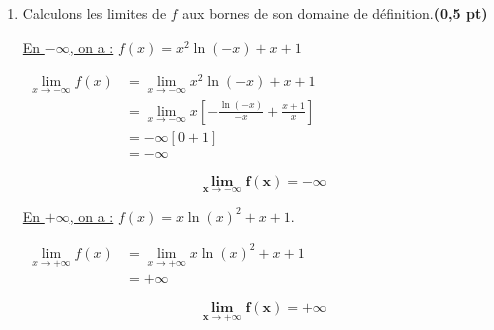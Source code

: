 \documentclass[12pt,a4paper]{article}
\begin{document}
\begin{enumerate}
\item Calculons les limites de \( f \) aux bornes de son domaine de définition.\hfill \textbf{(0,5 pt)}

\underline{En \( -\infty \), on a :} \( f(x) = x^2 \ln(-x) + x + 1 \)

\(
\begin{aligned}
    \lim\limits_{x\to -\infty} f(x) &= \lim\limits_{x\to -\infty} x^2 \ln(-x) + x + 1\\
    &= \lim\limits_{x\to -\infty} x \left[-\frac{\ln(-x)}{-x} + \frac{x + 1}{x}\right]\\
    &= -\infty \left[0+1 \right]\\
    &=-\infty
\end{aligned}
\)

\begin{resultbox}
    \[
        \mathbf{\lim\limits_{x\to -\infty} f(x) = -\infty }
    \]
\end{resultbox} 

\underline{En \( +\infty \), on a :} \( f(x) = x \ln(x)^2 + x + 1. \)

\(
\begin{aligned}
    \lim\limits_{x\to +\infty} f(x) &= \lim\limits_{x\to +\infty}  x \ln(x)^2 + x + 1\\
    &=+\infty
\end{aligned}
\)

\begin{resultbox}
    \[
        \mathbf{\lim\limits_{x\to +\infty} f(x) = +\infty }
    \]
\end{resultbox} 
\end{enumerate}
\end{document}
